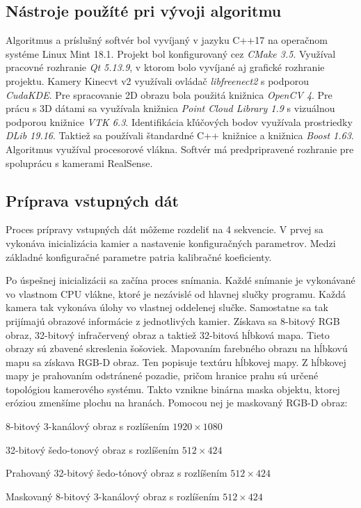 
\subsection{Nástroje použíté pri vývoji algoritmu}

Algoritmus a príslušný softvér bol vyvíjaný v jazyku C++17 na operačnom systéme Linux Mint 18.1. Projekt bol konfigurovaný cez \textit{CMake 3.5}. Využíval pracovné rozhranie \textit{Qt 5.13.9}, v ktorom bolo vyvíjané aj grafické rozhranie projektu. Kamery Kinecvt v2 využívali ovládač \textit{libfreenect2} s podporou \textit{CudaKDE}. Pre spracovanie 2D obrazu bola použitá knižnica \textit{OpenCV 4}. Pre prácu s 3D dátami sa využívala knižnica \textit{Point Cloud Library 1.9} s vizuálnou podporou knižnice \textit{VTK 6.3}. Identifikácia kľúčových bodov využívala prostriedky \textit{DLib 19.16}. Taktiež sa používali štandardné C++ knižnice a knižnica \textit{Boost 1.63}. Algoritmus využíval procesorové vlákna. Softvér má predpripravené rozhranie pre spoluprácu s kamerami RealSense. 

\subsection{Príprava vstupných dát}
\label{sec:data_prep}
Proces prípravy vstupných dát môžeme rozdeliť na 4 sekvencie.
V prvej sa vykonáva inicializácia kamier a nastavenie konfiguračných parametrov. Medzi základné konfiguračné parametre patria kalibračné koeficienty. 

Po úspešnej inicializácii sa začína proces snímania. Každé snímanie je vykonávané vo vlastnom CPU vlákne, ktoré je nezávislé od hlavnej slučky programu. Každá kamera tak vykonáva úlohy vo vlastnej oddelenej slučke. Samostatne sa tak prijímajú obrazové informácie z jednotlivých kamier. Získava sa 8-bitový RGB obraz, 32-bitový infračervený obraz a taktiež 32-bitová hĺbková mapa. Tieto obrazy sú zbavené skreslenia šošoviek. Mapovaním farebného obrazu na hĺbkovú mapu sa získava RGB-D obraz. Ten popisuje textúru hĺbkovej mapy. Z hĺbkovej mapy je prahovaním odstránené pozadie, pričom hranice prahu sú určené topológiou kamerového systému. Takto vznikne binárna maska objektu, ktorej eróziou zmenšíme plochu na hranách. Pomocou nej je maskovaný RGB-D obraz: 

\begin{description}[leftmargin=*, font=$\bullet$~\normalfont\scshape\color{black}]
	\item[RGB:] 	8-bitový 3-kanálový obraz s rozlíšením $1920 \times 1080$
	\item[IR:]	32-bitový šedo-tonový obraz s rozlíšením $512 \times 424$
	\item[Depth:] Prahovaný 32-bitový šedo-tónový obraz s rozlíšením $512 \times 424$
	\item[RGB-D:] Maskovaný 8-bitový 3-kanálový obraz s rozlíšením $512 \times 424$
\end{description}

